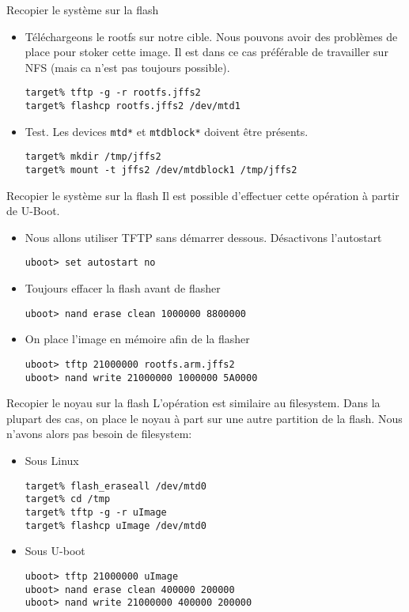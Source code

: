 \begin{frame}[fragile=singleslide]{Recopier le système sur la flash}
  \begin{itemize} 
  \item Téléchargeons  le rootfs sur  notre cible. Nous  pouvons avoir
    des problèmes  de place pour stoker  cette image.  Il  est dans ce
    cas préférable de  travailler sur NFS (mais ca  n'est pas toujours
    possible).
    \begin{lstlisting} 
target% tftp -g -r rootfs.jffs2
target% flashcp rootfs.jffs2 /dev/mtd1
    \end{lstlisting}
  \item Test. Les devices \verb+mtd*+ et \verb+mtdblock*+ doivent être présents.
    \begin{lstlisting}
target% mkdir /tmp/jffs2
target% mount -t jffs2 /dev/mtdblock1 /tmp/jffs2
    \end{lstlisting} 
  \end{itemize}
\end{frame}

\begin{frame}[fragile=singleslide]{Recopier le système sur la flash}
  Il est possible d'effectuer cette opération à partir de U-Boot.
  \begin{itemize} 
  \item Nous allons utiliser TFTP sans démarrer dessous. Désactivons l'autostart
    \begin{lstlisting} 
uboot> set autostart no
    \end{lstlisting} 
  \item Toujours effacer la flash avant de flasher
    \begin{lstlisting} 
uboot> nand erase clean 1000000 8800000
    \end{lstlisting} 
  \item On place l'image en mémoire afin de la flasher
    \begin{lstlisting} 
uboot> tftp 21000000 rootfs.arm.jffs2
uboot> nand write 21000000 1000000 5A0000
    \end{lstlisting} 
  \end{itemize}
\end{frame}

\begin{frame}[fragile=singleslide]{Recopier le noyau sur la flash}
  L'opération est similaire au filesystem. Dans la plupart des cas, on
  place le  noyau à  part sur  une autre partition  de la  flash. Nous
  n'avons alors pas besoin de filesystem:
  \begin{itemize} 
  \item Sous Linux
    \begin{lstlisting}
target% flash_eraseall /dev/mtd0
target% cd /tmp
target% tftp -g -r uImage
target% flashcp uImage /dev/mtd0
    \end{lstlisting}
  \item Sous U-boot
    \begin{lstlisting} 
uboot> tftp 21000000 uImage
uboot> nand erase clean 400000 200000
uboot> nand write 21000000 400000 200000
    \end{lstlisting} 
  \end{itemize}
\end{frame}

